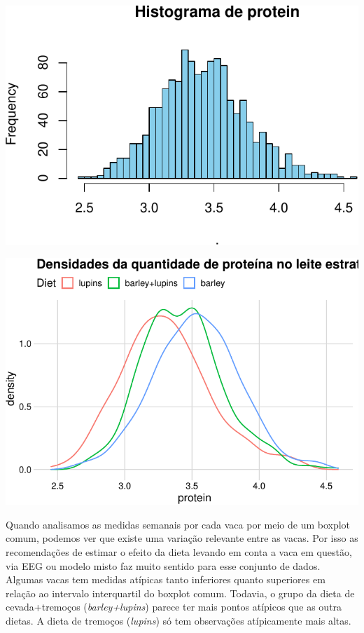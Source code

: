 \documentclass[
  11pt,
]{article}
\begin{document}
\begin{center}\includegraphics{lista3_files/figure-latex/unnamed-chunk-21-1} \end{center}

\begin{center}\includegraphics{lista3_files/figure-latex/unnamed-chunk-22-1} \end{center}

Quando analisamos as medidas semanais por cada vaca por meio de um boxplot comum, podemos ver que existe uma variação relevante entre as vacas. Por isso as recomendações de estimar o efeito da dieta levando em conta a vaca em questão, via EEG ou modelo misto faz muito sentido para esse conjunto de dados. Algumas vacas tem medidas atípicas tanto inferiores quanto superiores em relação ao intervalo interquartil do boxplot comum. Todavia, o grupo da dieta de cevada+tremoços (\emph{barley+lupins}) parece ter mais pontos atípicos que as outra dietas. A dieta de tremoços (\emph{lupins}) só tem observações atípicamente mais altas.
\end{document}
